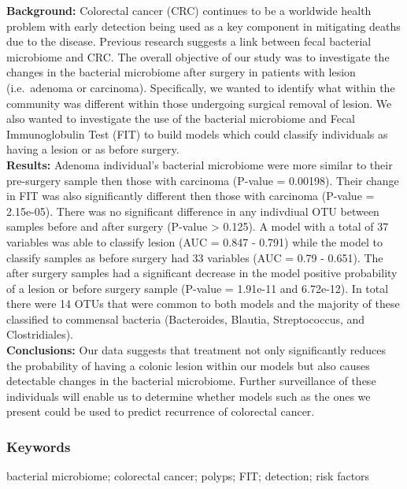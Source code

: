 \documentclass[12pt,]{article}
\begin{document}
\textbf{Background:} Colorectal cancer (CRC) continues to be a worldwide
health problem with early detection being used as a key component in
mitigating deaths due to the disease. Previous research suggests a link
between fecal bacterial microbiome and CRC. The overall objective of our
study was to investigate the changes in the bacterial microbiome after
surgery in patients with lesion (i.e.~adenoma or carcinoma).
Specifically, we wanted to identify what within the community was
different within those undergoing surgical removal of lesion. We also
wanted to investigate the use of the bacterial microbiome and Fecal
Immunoglobulin Test (FIT) to build models which could classify
individuals as having a lesion or as before surgery.\\
\textbf{Results:} Adenoma individual's bacterial microbiome were more
similar to their pre-surgery sample then those with carcinoma (P-value =
0.00198). Their change in FIT was also significantly different then
those with carcinoma (P-value = 2.15e-05). There was no significant
difference in any indivdiual OTU between samples before and after
surgery (P-value \textgreater{} 0.125). A model with a total of 37
variables was able to classify lesion (AUC = 0.847 - 0.791) while the
model to classify samples as before surgery had 33 variables (AUC = 0.79
- 0.651). The after surgery samples had a significant decrease in the
model positive probability of a lesion or before surgery sample (P-value
= 1.91e-11 and 6.72e-12). In total there were 14 OTUs that were common
to both models and the majority of these classified to commensal
bacteria (Bacteroides, Blautia, Streptococcus, and Clostridiales).\\
\textbf{Conclusions:} Our data suggests that treatment not only
significantly reduces the probability of having a colonic lesion within
our models but also causes detectable changes in the bacterial
microbiome. Further surveillance of these individuals will enable us to
determine whether models such as the ones we present could be used to
predict recurrence of colorectal cancer.

\newpage

\subsubsection{Keywords}\label{keywords}

bacterial microbiome; colorectal cancer; polyps; FIT; detection; risk
factors

\newpage
\end{document}
